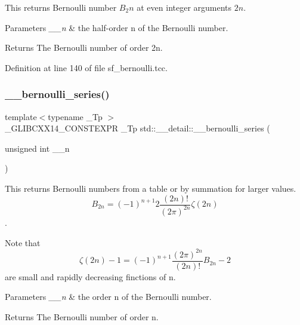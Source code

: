 This returns Bernoulli number $ B_2n $ at even integer arguments $ 2n $. 


\begin{DoxyParams}{Parameters}
{\em \+\_\+\+\_\+n} & the half-\/order n of the Bernoulli number. \\
\hline
\end{DoxyParams}
\begin{DoxyReturn}{Returns}
The Bernoulli number of order 2n. 
\end{DoxyReturn}


Definition at line 140 of file sf\+\_\+bernoulli.\+tcc.

\mbox{\label{namespacestd_1_1____detail_ad3d3e44d340742b0362a8ad95080d315}} 
\subsubsection{\texorpdfstring{\+\_\+\+\_\+bernoulli\+\_\+series()}{\_\_bernoulli\_series()}}
{\footnotesize\ttfamily template$<$typename \+\_\+\+Tp $>$ \\
\+\_\+\+G\+L\+I\+B\+C\+X\+X14\+\_\+\+C\+O\+N\+S\+T\+E\+X\+PR \+\_\+\+Tp std\+::\+\_\+\+\_\+detail\+::\+\_\+\+\_\+bernoulli\+\_\+series (\begin{DoxyParamCaption}\item[{unsigned int}]{\+\_\+\+\_\+n }\end{DoxyParamCaption})}



This returns Bernoulli numbers from a table or by summation for larger values. \[ B_{2n} = (-1)^{n+1} 2\frac{(2n)!}{(2\pi)^{2n}} \zeta(2n) \]. 

Note that \[ \zeta(2n) - 1 = (-1)^{n+1} \frac{(2\pi)^{2n}}{(2n)!} B_{2n} - 2 \] are small and rapidly decreasing finctions of n.


\begin{DoxyParams}{Parameters}
{\em \+\_\+\+\_\+n} & the order n of the Bernoulli number. \\
\hline
\end{DoxyParams}
\begin{DoxyReturn}{Returns}
The Bernoulli number of order n. 
\end{DoxyReturn}


